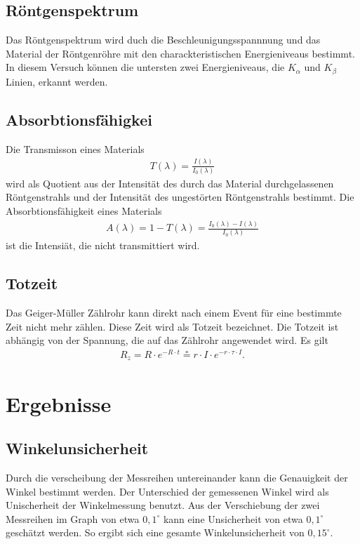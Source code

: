 \documentclass[11pt, a4paper]{article}
\begin{document}
    \subsection{Röntgenspektrum}

    Das Röntgenspektrum wird duch die Beschleunigungsspannnung und das Material der Röntgenröhre mit den charackteristischen Energieniveaus bestimmt. In diesem Versuch können die untersten zwei Energieniveaus, die $K_{\alpha}$ und $K_{\beta}$ Linien, erkannt werden.
    \subsection{Absorbtionsfähigkei}

    Die Transmisson eines Materials
    \begin{align}
        T(\lambda) = \frac{I(\lambda)}{I_{0}(\lambda)}
    \end{align}
    wird als Quotient aus der Intensität des durch das Material durchgelassenen Röntgenstrahls und der Intensität des ungestörten Röntgenstrahls bestimmt. Die Absorbtionsfähigkeit eines Materials
    \begin{align}
        A(\lambda) = 1 - T(\lambda) = \frac{I_{0}(\lambda) - I(\lambda)}{I_{0}(\lambda)}
    \end{align}
    ist die Intensiät, die nicht transmittiert wird.

    \subsection{Totzeit}
    Das Geiger-Müller Zählrohr kann direkt nach einem Event für eine bestimmte Zeit nicht mehr zählen. Diese Zeit wird als Totzeit bezeichnet. Die Totzeit ist abhängig von der Spannung, die auf das Zählrohr angewendet wird. Es gilt
    \begin{align}
        R_{z} = R \cdot e^{-R \cdot t} \circeq r \cdot I \cdot e^{-r \cdot \tau \cdot I}. \label{eq:totzeit}
    \end{align}

    \section{Ergebnisse}

    \subsection{Winkelunsicherheit}
    Durch die verscheibung der Messreihen untereinander kann die Genauigkeit der Winkel bestimmt werden. Der Unterschied der gemessenen Winkel wird als Unischerheit der Winkelmessung benutzt. Aus der Verschiebung der zwei Messreihen im Graph von etwa $0,1^{\circ}$ kann eine Unsicherheit von etwa $0,1^{\circ}$ geschätzt werden. So ergibt sich eine gesamte Winkelunsicherheit von $0,15^{\circ}$.
\end{document}
